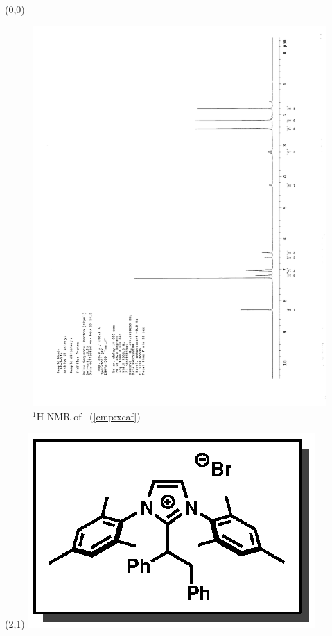 \begin{textblock}{20}(0,0)
\begin{figure}[htb]
\caption{$^1$H NMR of \CMPxcaf\ (\ref{cmp:xcaf})}
\includegraphics[scale=0.75, trim = 0mm 0mm 0mm 5mm,
clip]{chp_alkylation/images/nmr/xcafH}
\vspace{-100pt}
\end{figure}
\end{textblock}
\begin{textblock}{1}(2,1)
\includegraphics[scale=0.8, angle=90]{chp_alkylation/images/xcaf}
\end{textblock}
